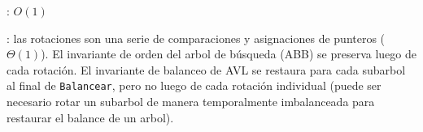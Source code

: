 \begin{Algoritmos}
	\complejidad: $O(1)$

	\justifcomp: las rotaciones son una serie de comparaciones y asignaciones de punteros ($\Theta(1)$). El invariante de orden del arbol de búsqueda (ABB) se preserva luego de cada rotación. El invariante de balanceo de AVL se restaura para cada subarbol al final de \texttt{Balancear}, pero no luego de cada rotación individual (puede ser necesario rotar un subarbol de manera temporalmente imbalanceada para restaurar el balance de un arbol).

\end{Algoritmos}